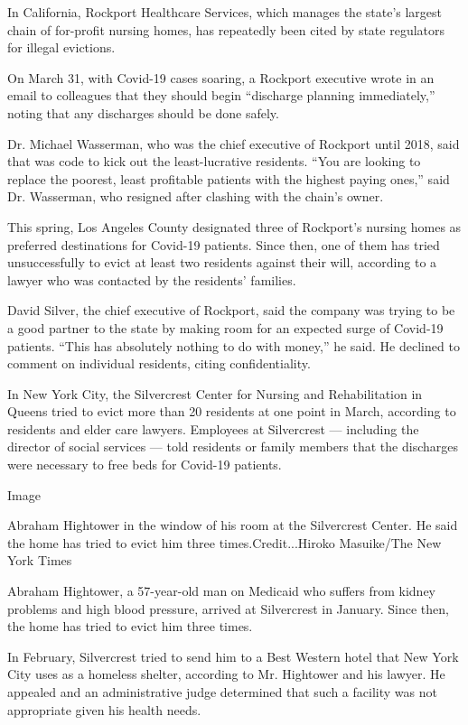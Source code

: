 In California, Rockport Healthcare Services, which manages the state's
largest chain of for-profit nursing homes, has repeatedly been cited by
state regulators for illegal evictions.

On March 31, with Covid-19 cases soaring, a Rockport executive wrote in
an email to colleagues that they should begin ``discharge planning
immediately,'' noting that any discharges should be done safely.

Dr. Michael Wasserman, who was the chief executive of Rockport until
2018, said that was code to kick out the least-lucrative residents.
``You are looking to replace the poorest, least profitable patients with
the highest paying ones,'' said Dr. Wasserman, who resigned after
clashing with the chain's owner.

This spring, Los Angeles County designated three of Rockport's nursing
homes as preferred destinations for Covid-19 patients. Since then, one
of them has tried unsuccessfully to evict at least two residents against
their will, according to a lawyer who was contacted by the residents'
families.

David Silver, the chief executive of Rockport, said the company was
trying to be a good partner to the state by making room for an expected
surge of Covid-19 patients. ``This has absolutely nothing to do with
money,'' he said. He declined to comment on individual residents, citing
confidentiality.

In New York City, the Silvercrest Center for Nursing and Rehabilitation
in Queens tried to evict more than 20 residents at one point in March,
according to residents and elder care lawyers. Employees at Silvercrest
--- including the director of social services --- told residents or
family members that the discharges were necessary to free beds for
Covid-19 patients.

Image

Abraham Hightower in the window of his room at the Silvercrest Center.
He said the home has tried to evict him three times.Credit...Hiroko
Masuike/The New York Times

Abraham Hightower, a 57-year-old man on Medicaid who suffers from kidney
problems and high blood pressure, arrived at Silvercrest in January.
Since then, the home has tried to evict him three times.

In February, Silvercrest tried to send him to a Best Western hotel that
New York City uses as a homeless shelter, according to Mr. Hightower and
his lawyer. He appealed and an administrative judge determined that such
a facility was not appropriate given his health needs.

